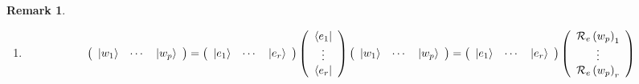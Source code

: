 \documentclass[aps,preprint]{revtex4}%
\newtheorem{remark}[theorem]{Remark}
\begin{document}
\begin{remark}
\begin{enumerate}
\begin{enumerate}
\begin{enumerate}
\item
\begin{equation}
\left(
\begin{array}
[c]{ccc}%
\left\vert w_{1}\right\rangle  & \cdots & \left\vert w_{p}\right\rangle
\end{array}
\right)  =\left(
\begin{array}
[c]{ccc}%
\left\vert e_{1}\right\rangle  & \cdots & \left\vert e_{r}\right\rangle
\end{array}
\right)  \left(
\begin{array}
[c]{c}%
\left\langle e_{1}\right\vert \\
\vdots\\
\left\langle e_{r}\right\vert
\end{array}
\right)  \left(
\begin{array}
[c]{ccc}%
\left\vert w_{1}\right\rangle  & \cdots & \left\vert w_{p}\right\rangle
\end{array}
\right)  =\left(
\begin{array}
[c]{ccc}%
\left\vert e_{1}\right\rangle  & \cdots & \left\vert e_{r}\right\rangle
\end{array}
\right)  \left(
\begin{array}
[c]{c}%
\mathcal{R}_{e}\left(  w_{p}\right)  _{1}\\
\vdots\\
\mathcal{R}_{e}\left(  w_{p}\right)  _{r}%
\end{array}
\right)
\end{equation}



\end{enumerate}
\end{enumerate}
\end{enumerate}
\end{remark}
\end{document}
